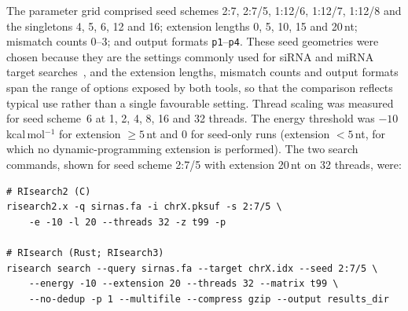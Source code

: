 \documentclass[11pt]{article}
\begin{document}
The parameter grid comprised seed schemes 2:7, 2:7/5, 1:12/6, 1:12/7, 1:12/8 and the singletons 4, 5, 6, 12 and 16; extension lengths 0, 5, 10, 15 and 20\,nt; mismatch counts 0--3; and output formats \texttt{p1}--\texttt{p4}.
These seed geometries were chosen because they are the settings commonly used for siRNA and miRNA target searches~\citep{alkan2017risearch2}, and the extension lengths, mismatch counts and output formats span the range of options exposed by both tools, so that the comparison reflects typical use rather than a single favourable setting.
Thread scaling was measured for seed scheme~6 at 1, 2, 4, 8, 16 and 32 threads.
The energy threshold was $-10$\,kcal\,mol$^{-1}$ for extension $\geq 5$\,nt and $0$ for seed-only runs (extension $<5$\,nt, for which no dynamic-programming extension is performed).
The two search commands, shown for seed scheme 2:7/5 with extension 20\,nt on 32 threads, were:

\begin{verbatim}
# RIsearch2 (C)
risearch2.x -q sirnas.fa -i chrX.pksuf -s 2:7/5 \
    -e -10 -l 20 --threads 32 -z t99 -p

# RIsearch (Rust; RIsearch3)
risearch search --query sirnas.fa --target chrX.idx --seed 2:7/5 \
    --energy -10 --extension 20 --threads 32 --matrix t99 \
    --no-dedup -p 1 --multifile --compress gzip --output results_dir
\end{verbatim}
\end{document}
